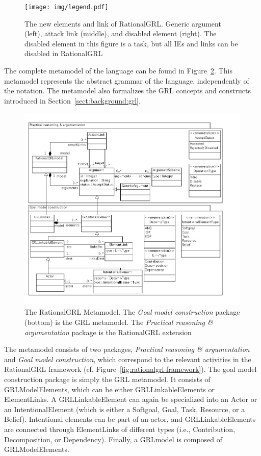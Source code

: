 \begin{figure}[b]
\centering
\texttt{[image: img/legend.pdf]}
\caption{The new elements and link of RationalGRL. Generic argument (left), attack link (middle), and disabled element (right). The disabled element in this figure is a task, but all IEs and links can be disabled in RationalGRL}
\label{fig:rationalgrllegend}
\end{figure}


The complete metamodel of the language can be found in Figure~\ref{fig:metamodel}. This metamodel represents the abstract grammar of the language, independently of the notation. The metamodel also formalizes the GRL concepts and constructs introduced in Section~\ref{sect:background:grl}.

\begin{figure}[t]
\includegraphics[width=\textwidth]{metamodel/metamodel2}
\caption{The RationalGRL Metamodel. The \emph{Goal model construction} package (bottom) is the GRL metamodel. The \emph{Practical reasoning \& argumentation} package is the RationalGRL extension}
\label{fig:metamodel}
\end{figure}

The metamodel consists of two packages, \emph{Practical reasoning \& argumentation} and \emph{Goal model construction}, which correspond to the relevant activities in the RationalGRL framework (cf. Figure~\ref{fig:rationalgrl-framework}). The goal model construction package is simply the GRL metamodel. It consists of \textsf{GRLModelElements}, which can be either \textsf{GRLLinkableElements} or \textsf{ElementLinks}. A \textsf{GRLLinkableElement} can again be specialized into an \textsf{Actor} or an \textsf{IntentionalElement} (which is either a \textsf{Softgoal}, \textsf{Goal}, \textsf{Task}, \textsf{Resource}, or a \textsf{Belief}). Intentional elements can be part of an actor, and \textsf{GRLLinkableElements} are connected through \textsf{ElementLinks} of different types (i.e., \textsf{Contribution, Decomposition}, or \textsf{Dependency}). Finally, a \textsf{GRLmodel} is composed of \textsf{GRLModelElements}.

